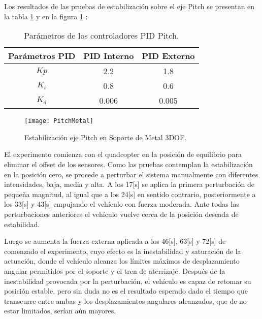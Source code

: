 \documentclass[../main.tex]{subfiles}
\begin{document}
Los resultados de las pruebas de estabilización sobre el eje Pitch
se presentan en la tabla \ref{table: Parametros Pitch Me} y en la figura \ref{fig: Resultados Pitch Me} :

\begin{table}[H]
\noindent \begin{centering}
\begin{tabular}{|c|c|c|}
\hline 
Parámetros PID & PID Interno & PID Externo\tabularnewline
\hline 
\hline 
$Kp$ & 2.2 & 1.8\tabularnewline
\hline 
$K_{i}$ & 0.8 & 0.6\tabularnewline
\hline 
$K_{d}$ & 0.006 & 0.005\tabularnewline
\hline 
\end{tabular}
\par\end{centering}
\caption{Parámetros de los controladores PID Pitch.}\label{table: Parametros Pitch Me}\noindent
\end{table}

\begin{figure}[H]
\noindent \begin{centering}
\texttt{[image: PitchMetal]}
\par\end{centering}
\caption{Estabilización eje Pitch en Soporte de Metal 3DOF.}\label{fig: Resultados Pitch Me}\noindent
\end{figure}

El experimento comienza con el quadcopter en la posición de equilibrio
para eliminar el offset de los sensores. Como las pruebas contemplan
la estabilización en la posición cero, se procede a perturbar el sistema
manualmente con diferentes intensidades, baja, media y alta. A los 17{[}s{]} se aplica la primera
perturbación de pequeña magnitud, al igual que a los 24{[}s{]} en
sentido contrario, posteriormente a los 33{[}s{]} y 43{[}s{]} empujando
el vehículo con fuerza moderada. Ante todas las perturbaciones anteriores
el vehículo vuelve cerca de la posición deseada de estabilidad. 

Luego se aumenta la fuerza externa aplicada a los 46{[}s{]}, 63{[}s{]}
y 72{[}s{]} de comenzado el experimento, cuyo efecto es la inestabilidad
y saturación de la actuación, donde el vehículo alcanza los límites
máximos de desplazamiento angular permitidos por el soporte y el tren
de aterrizaje. Después de la inestabilidad provocada por la perturbación,
el vehículo es capaz de retomar su posición estable, pero sin duda
no es el resultado esperado dado el tiempo que transcurre entre ambas
y los desplazamientos angulares alcanzados, que de no estar limitados,
serían aún mayores.
\end{document}
